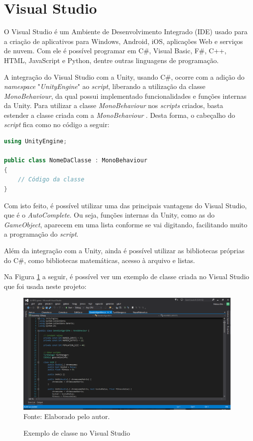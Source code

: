 \documentclass[
	12pt,					%
	openright,				%
	oneside,				%
	a4paper,				%
	bibjustif,				%
	chapter=TITLE,			%
	english,				%
	brazil,					%
	]{abntex2}
\newcommand{\source}[1]{\small Fonte: {#1}}
\begin{document}
	\FloatBarrier
	\section{Visual Studio}
		O Visual Studio é um Ambiente de Desenvolvimento Integrado (IDE) usado para a criação de aplicativos para Windows, Android, iOS, aplicações Web e serviços de nuvem.
		Com ele é possível programar em C\#, Visual Basic, F\#, C++, HTML, JavaScript e Python, dentre outras linguagens de programação. \cite{microsoft}
		
		A integração do Visual Studio com a Unity, usando C\#, ocorre com a adição do \textit{namespace} "\textit{UnityEngine}"{} ao \textit{script},
		liberando a utilização da classe \textit{MonoBehaviour},
		da qual possui implementado funcionalidades e funções internas da Unity.
		Para utilizar a classe \textit{MonoBehaviour} nos \textit{scripts} criados,
		basta estender a classe criada com a \textit{MonoBehaviour} \cite{unityScripts}.
		Desta forma, o cabeçalho do \textit{script} fica como no código a seguir:
		
		\begin{lstlisting}[language=C++]
using UnityEngine;

public class NomeDaClasse : MonoBehaviour
{
	// Código da classe
}\end{lstlisting}
		
		Com isto feito, é possível utilizar uma das principais vantagens do Visual Studio,
		que é o \textit{AutoComplete}.
		Ou seja, funções internas da Unity, como as do \textit{GameObject}, aparecem em uma lista conforme se vai digitando,
		facilitando muito a programação do \textit{script}.
		
		Além da integração com a Unity,
		ainda é possível utilizar as bibliotecas próprias do C\#,
		como bibliotecas matemáticas, acesso à arquivo e listas.
		
		Na Figura \ref{fig:exvs} a seguir, é possível ver um exemplo de classe criada no Visual Studio que foi usada neste projeto:
		
		\begin{figure}[ht!]
			\caption{Exemplo de classe no Visual Studio}
			\centering
			\includegraphics[scale=0.4]{img/InterfaceVisualStudio.png}\\
			\vspace{0.5mm}
			\source{Elaborado pelo autor.}
			\label{fig:exvs}
		\end{figure}
		
\end{document}
